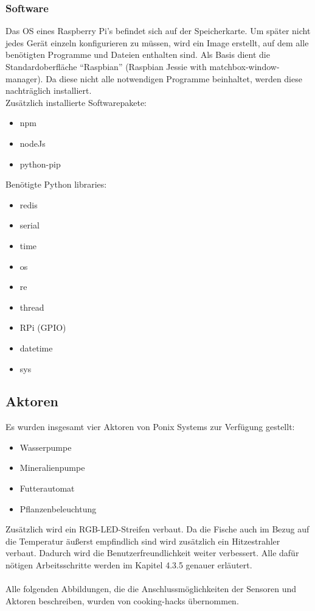\newpage
\subsubsection{Software}
Das \gls{OS} eines Raspberry Pi's befindet sich auf der Speicherkarte. Um später nicht jedes Gerät einzeln konfigurieren zu müssen, wird ein Image erstellt, auf dem alle benötigten Programme und Dateien enthalten sind. Als Basis dient die Standardoberfläche "`Raspbian"' (Raspbian Jessie with matchbox-window-manager). Da diese nicht alle notwendigen Programme beinhaltet, werden diese nachträglich installiert. \\ 
Zusätzlich installierte Softwarepakete:
\begin{itemize}
    \item npm
    \item nodeJs
    \item python-pip
\end{itemize}
Benötigte Python libraries:
\begin{itemize}
    \item redis
    \item serial
    \item time
    \item os
    \item re
    \item thread
    \item RPi (GPIO)
    \item datetime
    \item sys
\end{itemize}
\newpage

\subsection{Aktoren}
Es wurden insgesamt vier Aktoren von Ponix Systems zur Verf\"ugung gestellt:
\begin{itemize}
    \item Wasserpumpe
    \item Mineralienpumpe
    \item Futterautomat
    \item Pflanzenbeleuchtung
\end{itemize} 
Zusätzlich wird ein RGB-LED-Streifen verbaut.
Da die Fische auch im Bezug auf die Temperatur äußerst empfindlich sind wird zusätzlich ein Hitzestrahler verbaut. Dadurch wird die Benutzerfreundlichkeit weiter verbessert. Alle dafür nötigen Arbeitsschritte werden im Kapitel 4.3.5 genauer erläutert. \\ \mbox{} \\
Alle folgenden Abbildungen, die die Anschlussmöglichkeiten der Sensoren und Aktoren beschreiben, wurden von cooking-hacks übernommen. \cite{OpenAquarium}
